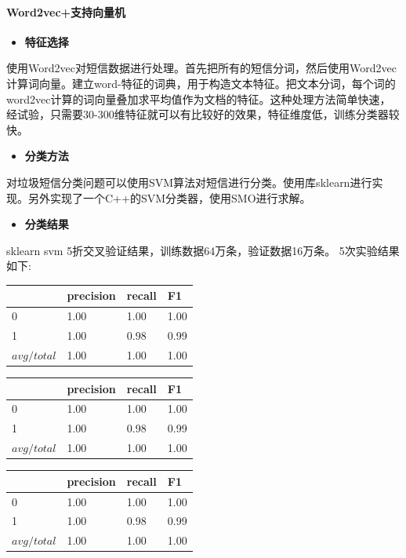 \documentclass{article}
\begin{document}
\paragraph{Word2vec+支持向量机}\label{word2vecux652fux6301ux5411ux91cfux673a}

\begin{itemize}
\tightlist
\item
  \textbf{特征选择}
\end{itemize}

使用Word2vec对短信数据进行处理。首先把所有的短信分词，然后使用Word2vec计算词向量。建立word-特征的词典，用于构造文本特征。把文本分词，每个词的word2vec计算的词向量叠加求平均值作为文档的特征。这种处理方法简单快速，经试验，只需要30-300维特征就可以有比较好的效果，特征维度低，训练分类器较快。

\begin{itemize}
\tightlist
\item
  \textbf{分类方法}
\end{itemize}

对垃圾短信分类问题可以使用SVM算法对短信进行分类。使用库sklearn进行实现。另外实现了一个C++的SVM分类器，使用SMO进行求解。

\begin{itemize}
\tightlist
\item
  \textbf{分类结果}
\end{itemize}

sklearn svm 5折交叉验证结果，训练数据64万条，验证数据16万条。
5次实验结果如下:

\begin{longtable}[]{@{}llll@{}}
\toprule
& precision & recall & F1\tabularnewline
\midrule
\endhead
0 & 1.00 & 1.00 & 1.00\tabularnewline
1 & 1.00 & 0.98 & 0.99\tabularnewline
\(avg/total\) & 1.00 & 1.00 & 1.00\tabularnewline
\bottomrule
\end{longtable}

\begin{longtable}[]{@{}llll@{}}
\toprule
& precision & recall & F1\tabularnewline
\midrule
\endhead
0 & 1.00 & 1.00 & 1.00\tabularnewline
1 & 1.00 & 0.98 & 0.99\tabularnewline
\(avg/total\) & 1.00 & 1.00 & 1.00\tabularnewline
\bottomrule
\end{longtable}

\begin{longtable}[]{@{}llll@{}}
\toprule
& precision & recall & F1\tabularnewline
\midrule
\endhead
0 & 1.00 & 1.00 & 1.00\tabularnewline
1 & 1.00 & 0.98 & 0.99\tabularnewline
\(avg/total\) & 1.00 & 1.00 & 1.00\tabularnewline
\bottomrule
\end{longtable}
\end{document}
